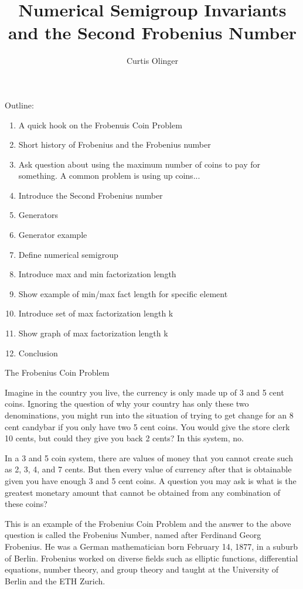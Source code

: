 \documentclass{article}
\title{Numerical Semigroup Invariants and the Second Frobenius Number}
\author{Curtis Olinger}
\begin{document}
\maketitle

Outline:
\begin{enumerate}
\item A quick hook on the Frobenuis Coin Problem
\item Short history of Frobenius and the Frobenius number
\item Ask question about using the maximum number of coins to pay for something. A common problem is using up coins...
\item Introduce the Second Frobenius number

\item Generators
\item Generator example
\item Define numerical semigroup

\item Introduce max and min factorization length
\item Show example of min/max fact length for specific element
\item Introduce set of max factorization length k
\item Show graph of max factorization length k
\item Conclusion
\end{enumerate}


The Frobenius Coin Problem


Imagine in the country you live, the currency is only made up of 3 and 5 cent coins. Ignoring the question of why your country has only these two denominations, you might run into the situation of trying to get change for an 8 cent candybar if you only have two 5 cent coins. You would give the store clerk 10 cents, but could they give you back 2 cents? In this system, no.

In a 3 and 5 coin system, there are values of money that you cannot create such as 2, 3, 4, and 7 cents. But then every value of currency after that is obtainable given you have enough 3 and 5 cent coins. A question you may ask is what is the greatest monetary amount that cannot be obtained from any combination of these coins?

This is an example of the Frobenius Coin Problem and the answer to the above question is called the Frobenius Number, named after Ferdinand Georg Frobenius. He was a German mathematician born February 14, 1877, in a suburb of Berlin. Frobenius worked on diverse fields such as elliptic functions, differential equations, number theory, and group theory and taught at the University of Berlin and the ETH Zurich. 
\end{document}
